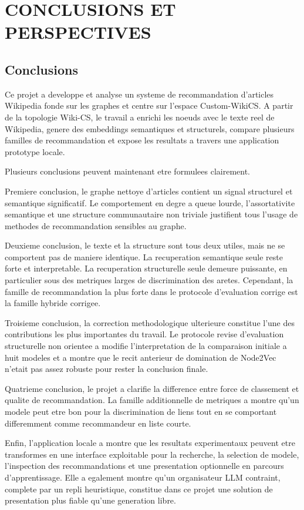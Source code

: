 \chapter{CONCLUSIONS ET PERSPECTIVES}
\thispagestyle{empty}

\section{Conclusions}

Ce projet a developpe et analyse un systeme de recommandation d'articles
Wikipedia fonde sur les graphes et centre sur l'espace Custom-WikiCS. A partir
de la topologie Wiki-CS, le travail a enrichi les noeuds avec le texte reel de
Wikipedia, genere des embeddings semantiques et structurels, compare plusieurs
familles de recommandation et expose les resultats a travers une application
prototype locale.

Plusieurs conclusions peuvent maintenant etre formulees clairement.

Premiere conclusion, le graphe nettoye d'articles contient un signal structurel
et semantique significatif. Le comportement en degre a queue lourde,
l'assortativite semantique et une structure communautaire non triviale
justifient tous l'usage de methodes de recommandation sensibles au graphe.

Deuxieme conclusion, le texte et la structure sont tous deux utiles, mais ne se
comportent pas de maniere identique. La recuperation semantique seule reste
forte et interpretable. La recuperation structurelle seule demeure puissante,
en particulier sous des metriques larges de discrimination des aretes.
Cependant, la famille de recommandation la plus forte dans le protocole
d'evaluation corrige est la famille hybride corrigee.

Troisieme conclusion, la correction methodologique ulterieure constitue l'une
des contributions les plus importantes du travail. Le protocole revise
d'evaluation structurelle non orientee a modifie l'interpretation de la
comparaison initiale a huit modeles et a montre que le recit anterieur de
domination de Node2Vec n'etait pas assez robuste pour rester la conclusion
finale.

Quatrieme conclusion, le projet a clarifie la difference entre force de
classement et qualite de recommandation. La famille additionnelle de metriques
a montre qu'un modele peut etre bon pour la discrimination de liens tout en se
comportant differemment comme
recommandeur en liste courte.

Enfin, l'application locale a montre que les resultats experimentaux peuvent
etre transformes en une interface exploitable pour la recherche, la selection
de modele, l'inspection des recommandations et une presentation optionnelle en
parcours d'apprentissage. Elle a egalement montre qu'un organisateur LLM
contraint, complete par un repli heuristique, constitue dans ce projet une
solution de presentation plus fiable qu'une generation libre.

